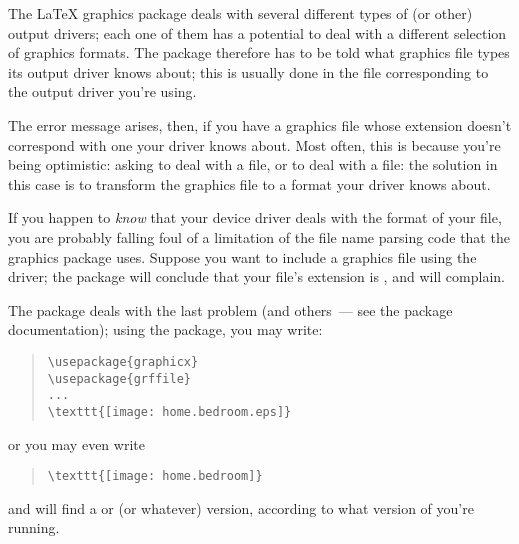{The \LaTeX{} graphics package deals with several different types of
 (or other) output drivers; each one of them has a potential
to deal with a different selection of graphics formats.  The package
therefore has to be told what graphics file types its output driver
knows about; this is usually done in the  file
corresponding to the output driver you're using.

The error message arises, then, if you have a graphics file whose
extension doesn't correspond with one your driver knows about.  Most
often, this is because you're being optimistic: asking
 to deal with a  file, or \PDFTeX{} to deal with
a  file: the solution in this case is to transform the graphics
file to a format your driver knows about.

If you happen to \emph{know} that your device driver deals with the
format of your file, you are probably falling foul of a limitation of
the file name parsing code that the graphics package uses.  Suppose
you want to include a graphics file  using the
 driver; the package will conclude that your file's
extension is , and will complain.

The  package deals with the last problem (and
others~--- see the package documentation); using the package, you may
write:
\begin{quote}
\begin{verbatim}
\usepackage{graphicx}
\usepackage{grffile}
...
\texttt{[image: home.bedroom.eps]}
\end{verbatim}
\end{quote}
or you may even write
\begin{quote}
\begin{verbatim}
\texttt{[image: home.bedroom]}
\end{verbatim}
\end{quote}
and  will find a  or 
(or whatever) version, according to what version of \AllTeX{} you're
running.

}
